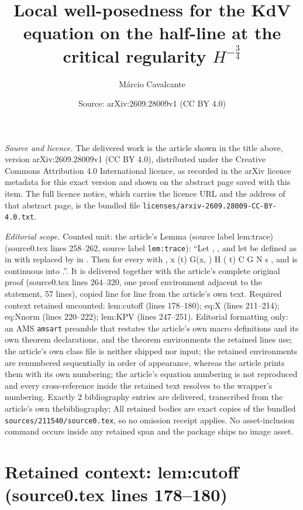 \documentclass[10pt,a4paper]{amsart}
\title[Local well-posedness for the KdV equation on the half-line at the critical regularity $H^{-\frac34}$]{Local well-posedness for the KdV equation on the half-line at the critical regularity $H^{-\frac34}$}
\author{M\'arcio Cavalcante}
\date{Source: arXiv:2609.28009v1 (CC BY 4.0)}
\theoremstyle{plain}
\theoremstyle{remark}
\begin{document}
\maketitle

\noindent\emph{Source and licence.} The delivered work is the article shown in the title above, version arXiv:2609.28009v1 (CC BY 4.0), distributed under the Creative Commons Attribution 4.0 International licence, as recorded in the arXiv licence metadata for this exact version and shown on the abstract page saved with this item. The full licence notice, which carries the licence URL and the address of that abstract page, is the bundled file \texttt{licenses/arxiv-2609.28009-CC-BY-4.0.txt}.
\par\smallskip

\noindent\textit{Editorial scope.} Counted unit: the article's Lemma (source label lem:trace) (source0.tex lines 258--262, source label \texttt{lem:trace}): ``Let , , and let be defined as in with replaced by in . Then for every with , x (t) G(x, ) H ( t) C G N s , and is continuous into .''. It is delivered together with the article's complete original proof (source0.tex lines 264--320, one proof environment adjacent to the statement, 57 lines), copied line for line from the article's own text. Required context retained uncounted: lem:cutoff (lines 178--180); eq:X (lines 211--214); eq:Nnorm (lines 220--222); lem:KPV (lines 247--251). Editorial formatting only: an AMS \texttt{amsart} preamble that restates the article's own macro definitions and its own theorem declarations, and the theorem environments the retained lines use; the article's own class file is neither shipped nor input; the retained environments are renumbered sequentially in order of appearance, whereas the article prints them with its own numbering; the article's equation numbering is not reproduced and every cross-reference inside the retained text resolves to the wrapper's numbering. Exactly 2 bibliography entries are delivered, transcribed from the article's own thebibliography; All retained bodies are exact copies of the bundled \texttt{sources/211540/source0.tex}, so no omission receipt applies. No asset-inclusion command occurs inside any retained span and the package ships no image asset.


\section*{Retained context: lem:cutoff (source0.tex lines 178--180)}
\end{document}
